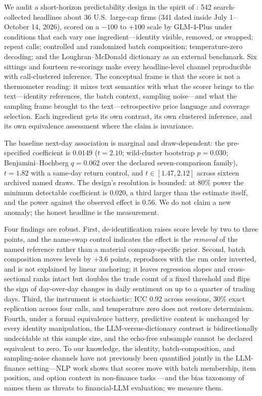 \documentclass[11pt]{article}
\begin{document}
We audit a short-horizon predictability design in the spirit of \citet{lopezlira2026}: 542 search-collected headlines about 36 U.S.\ large-cap firms (341 dated inside July 1--October 14, 2026), scored on a $-100$ to $+100$ scale by GLM-4-Plus under conditions that each vary one ingredient---identity visible, removed, or swapped; repeat calls; controlled and randomized batch composition; temperature-zero decoding; and the Loughran--McDonald dictionary \citep{loughran2011} as an external benchmark. Six sittings and fourteen re-scorings make every headline-level channel reproducible with call-clustered inference. The conceptual frame is that the score is not a thermometer reading: it mixes text semantics with what the scorer brings to the text---identity references, the batch context, sampling noise---and what the sampling frame brought to the text---retrospective price language and coverage selection. Each ingredient gets its own contrast, its own clustered inference, and its own equivalence assessment where the claim is invariance.

The baseline next-day association is marginal and draw-dependent: the pre-specified coefficient is $0.0149$ ($t=2.10$; wild-cluster bootstrap $p=0.030$; Benjamini--Hochberg $q=0.062$ over the declared seven-comparison family), $t=1.82$ with a same-day return control, and $t\in[1.47,2.12]$ across sixteen archived named draws. The design's resolution is bounded: at 80\% power the minimum detectable coefficient is $0.020$, a third larger than the estimate itself, and the power against the observed effect is $0.56$. We do not claim a new anomaly; the honest headline is the measurement.

Four findings are robust. First, de-identification raises score levels by two to three points, and the name-swap control indicates the effect is the \emph{removal} of the named reference rather than a material company-specific prior. Second, batch composition moves levels by $+3.6$ points, reproduces with the run order inverted, and is not explained by linear anchoring; it leaves regression slopes and cross-sectional ranks intact but doubles the trade count of a fixed threshold and flips the sign of day-over-day changes in daily sentiment on up to a quarter of trading days. Third, the instrument is stochastic: ICC $0.92$ across sessions, 30\% exact replication across four calls, and temperature zero does not restore determinism. Fourth, under a formal equivalence battery, predictive content is unchanged by every identity manipulation, the LLM-versus-dictionary contrast is bidirectionally undecidable at this sample size, and the echo-free subsample cannot be declared equivalent to zero. To our knowledge, the identity, batch-composition, and sampling-noise channels have not previously been quantified jointly in the LLM-finance setting---NLP work shows that scores move with batch membership, item position, and option context in non-finance tasks \citep{lin2024batch,liu2024lost,zheng2024,korikov2025}---and the bias taxonomy of \citet{kong2026} names them as threats to financial-LLM evaluation; we measure them.
\end{document}
